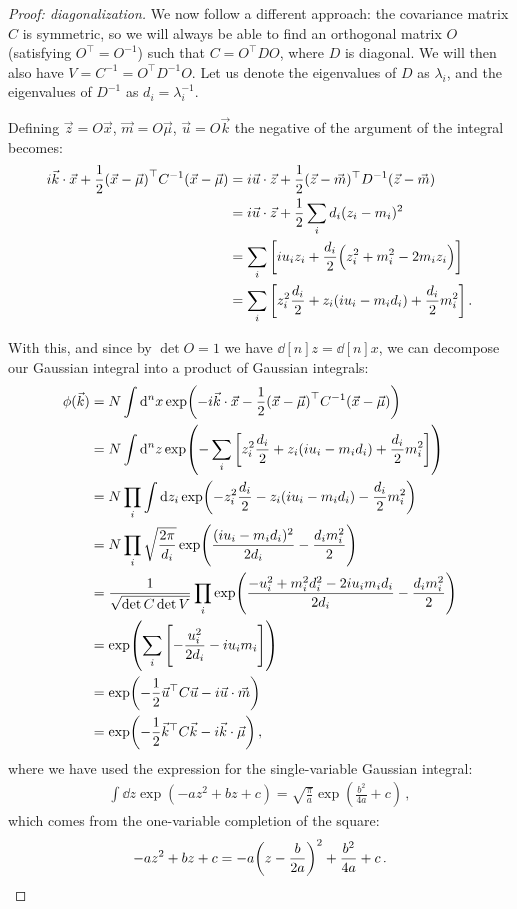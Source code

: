 \documentclass[main.tex]{subfiles}
\begin{document}
\begin{proof}[Proof: diagonalization]
We now follow a different approach: the covariance matrix \(C\) is symmetric, so we will always be able to find an orthogonal matrix \(O\) (satisfying \(O^{\top} = O^{-1}\)) such that \(C = O^{\top} D O\), where \(D\) is diagonal. 
We will then also have \(V = C^{-1} = O^{\top} D^{-1} O\).
Let us denote the eigenvalues of \(D\) as \(\lambda _i\), and the eigenvalues of \(D^{-1}\) as \(d_i = \lambda _i^{-1}\).

Defining \(\vec{z} = O \vec{x}\), \(\vec{m} = O \vec{\mu}\), \(\vec{u} = O \vec{k}\) the negative of the argument of the integral becomes:
%
\begin{align}
 i \vec{k} \cdot \vec{x} 
 + \frac{1}{2}
\qty(\vec{x} - \vec{\mu})^{\top} C^{-1} 
\qty(\vec{x} - \vec{\mu}) &=
 i \vec{u} \cdot \vec{z} 
+ \frac{1}{2} (\vec{z} - \vec{m})^{\top} D^{-1} (\vec{z} - \vec{m})  \\
&= 
i \vec{u} \cdot \vec{z} 
+ \frac{1}{2} \sum _{i} d_i (z_i - m_i)^2   \\
&= \sum _{i} \qty[i u_i z_i + \frac{d_i}{2} \qty(z_i^2 + m_i^2 - 2 m_i z_i)]  \\
&= \sum _{i} \qty[z_i^2 \frac{d_i}{2} + z_i \qty(i u_i - m_i d_i) + \frac{d_i}{2} m_i^2]
\,.
\end{align}

With this, and since by \(\det O = 1\) we have \(\dd[n]{z} = \dd[n]{x}\), we can decompose our Gaussian integral into a product of Gaussian integrals:
%
\begin{align}
\phi (\vec{k}) &= 
N \int \dd[n]{x} \exp(-  i \vec{k} \cdot \vec{x} 
 - \frac{1}{2}
\qty(\vec{x} - \vec{\mu})^{\top} C^{-1} 
\qty(\vec{x} - \vec{\mu}))  \\
&= N \int \dd[n]{z} \exp(- \sum _{i} \qty[z_i^2 \frac{d_i}{2} + z_i \qty(i u_i - m_i d_i) + \frac{d_i}{2} m_i^2])  \\
&= N \prod_i \int \dd{z_i}
\exp(- z_i^2 \frac{d_i}{2} - z_i \qty(i u_i - m_i d_i) - \frac{d_i}{2} m_i^2)  \\
&= N \prod_i \sqrt{\frac{2\pi }{d_i}} \exp(\frac{(i u_i - m_i d_i)^2}{2 d_i} - \frac{d_im_i^2}{2}) \\
&= \frac{1}{\sqrt{\det C \det V}} \prod_i \exp(\frac{- u_i^2 + m_i^2 d_i^2 - 2 i u_i m_i d_i }{2 d_i} - \frac{d_i m_i^2}{2}) \\
&= \exp(\sum _{i} \qty[- \frac{u_i^2}{2d_i} - i u_i m_i])  \\
&= \exp(- \frac{1}{2} \vec{u}^{\top} C \vec{u} - i \vec{u} \cdot \vec{m})  \\
&= \exp(- \frac{1}{2} \vec{k}^{\top} C \vec{k} - i \vec{k} \cdot \vec{\mu })
\,,
\end{align}
%
where we have used the expression for the single-variable Gaussian integral: 
%
\begin{align}
\int \dd{z} \exp(- a z^2 + bz + c) = \sqrt{ \frac{\pi}{a}} \exp( \frac{b^2}{4 a} + c)
\,,
\end{align}
%
which comes from the one-variable completion of the square: 
%
\begin{align}
-az^2 + bz + c = -a \qty(z - \frac{b}{2a})^2 + \frac{b^2}{4a} + c
\,.
\end{align}


\end{proof}
\end{document}

